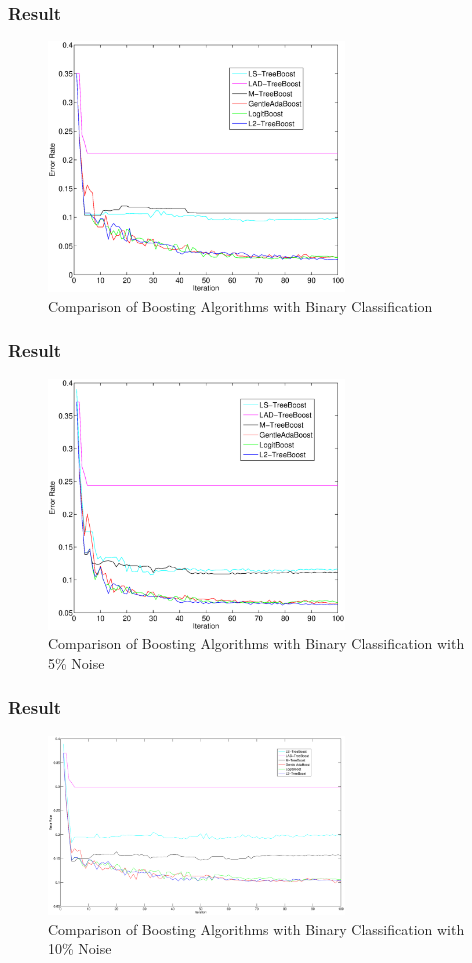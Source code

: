 \documentclass[]{beamer}
\begin{document}
\begin{frame}
	\frametitle{Result}
	\begin{figure}
		\caption{Comparison of Boosting Algorithms with Binary Classification}
		\includegraphics[width = 0.7\textwidth]{Figures/bin_class_comparison.eps}
	\end{figure}
\end{frame}
\begin{frame}
	\frametitle{Result}
	\begin{figure}
		\caption{Comparison of Boosting Algorithms with Binary Classification with 5\% Noise}
		\includegraphics[width = 0.7\textwidth]{Figures/bin_class_comparison_noise_5per.eps}
	\end{figure}
\end{frame}
\begin{frame}
	\frametitle{Result}
	\begin{figure}
		\caption{Comparison of Boosting Algorithms with Binary Classification with 10\% Noise}
		\includegraphics[width = 0.7\textwidth]{Figures/bin_class_comparison_noise_10per.eps}
	\end{figure}
\end{frame}
\end{document}
